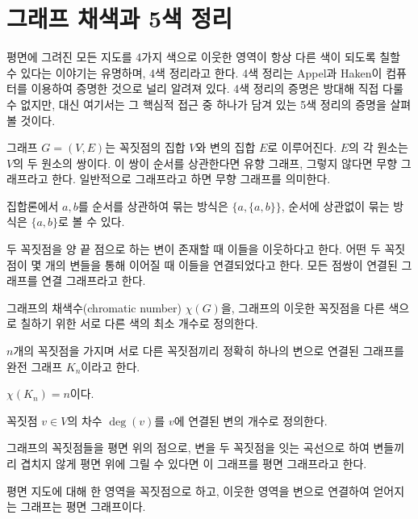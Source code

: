 \section{그래프 채색과 5색 정리}
평면에 그려진 모든 지도를 4가지 색으로 이웃한 영역이 항상 다른 색이 되도록 칠할 수 있다는 이야기는 유명하며, 4색 정리라고 한다. 4색 정리는 Appel과 Haken이 컴퓨터를 이용하여 증명한 것으로 널리 알려져 있다. 4색 정리의 증명은 방대해 직접 다룰 수 없지만, 대신 여기서는 그 핵심적 접근 중 하나가 담겨 있는 5색 정리의 증명을 살펴볼 것이다. 
\begin{definition}\label{def:graph}
    그래프 $G=(V, E)$는 꼭짓점의 집합 $V$와 변의 집합 $E$로 이루어진다. $E$의 각 원소는 $V$의 두 원소의 쌍이다. 이 쌍이 순서를 상관한다면 유향 그래프, 그렇지 않다면 무향 그래프라고 한다. 일반적으로 그래프라고 하면 무향 그래프를 의미한다. 
\end{definition}
\begin{remark}
    집합론에서 $a, b$를 순서를 상관하여 묶는 방식은 $\{a, \{a, b\}\}$, 순서에 상관없이 묶는 방식은 $\{a, b\}$로 볼 수 있다. 
\end{remark}
\begin{definition}
    두 꼭짓점을 양 끝 점으로 하는 변이 존재할 때 이들을 이웃하다고 한다. 어떤 두 꼭짓점이 몇 개의 변들을 통해 이어질 때 이들을 연결되었다고 한다. 모든 점쌍이 연결된 그래프를 연결 그래프라고 한다. 
\end{definition}
\begin{definition}
    그래프의 채색수(chromatic number) $\chi(G)$을, 그래프의 이웃한 꼭짓점을 다른 색으로 칠하기 위한 서로 다른 색의 최소 개수로 정의한다. 
\end{definition}
\begin{definition}
    $n$개의 꼭짓점을 가지며 서로 다른 꼭짓점끼리 정확히 하나의 변으로 연결된 그래프를 완전 그래프 $K_n$이라고 한다. 
\end{definition}
\begin{remark}
    $\chi(K_n)=n$이다. 
\end{remark}
\begin{definition}
    꼭짓점 $v\in V$의 차수 $\deg(v)$를 $v$에 연결된 변의 개수로 정의한다. 
\end{definition}
\begin{definition}
    그래프의 꼭짓점들을 평면 위의 점으로, 변을 두 꼭짓점을 잇는 곡선으로 하여 변들끼리 겹치지 않게 평면 위에 그릴 수 있다면 이 그래프를 평면 그래프라고 한다. 
\end{definition}
\begin{lemma}
    평면 지도에 대해 한 영역을 꼭짓점으로 하고, 이웃한 영역을 변으로 연결하여 얻어지는 그래프는 평면 그래프이다. 
\end{lemma}
